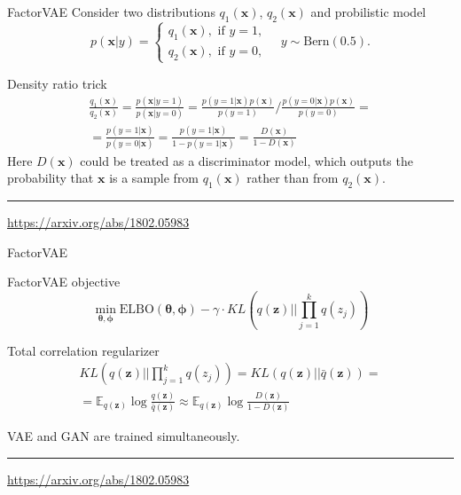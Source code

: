 \documentclass{beamer}
\newcommand{\bx}{\mathbf{x}}
\newcommand{\bz}{\mathbf{z}}
\newcommand{\bbE}{\mathbb{E}}
\newcommand{\btheta}{\boldsymbol{\theta}}
\newcommand{\bphi}{\boldsymbol{\phi}}
\begin{document}
\begin{frame}{FactorVAE}
	Consider two distributions $q_1(\bx)$, $q_2(\bx)$ and probilistic model
	\[
		p(\bx | y) = \begin{cases}
			q_1(\bx), \text{ if } y = 1, \\
			q_2(\bx), \text{ if } y = 0,
		\end{cases}
		\quad 
		y \sim \text{Bern}(0.5).
	\]
	\begin{block}{Density ratio trick}
		\vspace{-0.5cm}
		\begin{multline*}
			\frac{q_1(\bx)}{q_2(\bx)} = \frac{p(\bx | y = 1)}{p(\bx | y = 0)} = \frac{p(y = 1 | \bx) p(\bx)}{p(y=1)} \bigg/ \frac{p(y = 0 | \bx) p(\bx)}{p(y=0)} = \\
			= \frac{p(y = 1 | \bx)}{p(y = 0 | \bx)} = \frac{p(y = 1 | \bx)}{1 - p(y = 1 | \bx)} = \frac{D(\bx)}{1 - D(\bx)}
		\end{multline*}
	Here $D(\bx)$ could be treated as a discriminator model, which outputs the probability that $\bx$ is a sample
	from $q_1(\bx)$ rather than from $q_2(\bx)$.
	\end{block}
	
	\vfill
	\hrule\medskip
	{\scriptsize \href{https://arxiv.org/abs/1802.05983}{https://arxiv.org/abs/1802.05983}}
\end{frame}
\begin{frame}{FactorVAE}
	
	\begin{block}{FactorVAE objective}
		\vspace{-0.3cm}
		\[
		\min_{\btheta, \bphi} \text{ELBO}(\btheta, \bphi) - \gamma \cdot KL(q(\bz) || \prod_{j=1}^k q(z_j))
		\]
		\vspace{-0.3cm}
	\end{block}
	
	\begin{block}{Total correlation regularizer}
		\vspace{-0.7cm}
		\begin{multline*}
		KL(q(\bz) || \prod_{j=1}^k q(z_j)) = KL(q(\bz) || \bar{q}(\bz)) = \\ =\bbE_{q(\bz)} \log \frac{q(\bz)}{\bar{q}(\bz)} \approx \bbE_{q(\bz)} \log \frac{D(\bz)}{1 - D(\bz)}
		\end{multline*}
		\vspace{-0.3cm}
	\end{block}
	VAE and GAN are trained simultaneously.
	
	\vfill
	\hrule\medskip
	{\scriptsize \href{https://arxiv.org/abs/1802.05983}{https://arxiv.org/abs/1802.05983}}
\end{frame}
\end{document}
